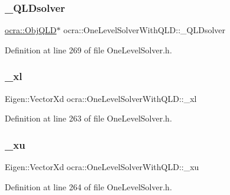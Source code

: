 \subsubsection{\texorpdfstring{\+\_\+\+Q\+L\+Dsolver}{\_QLDsolver}}
{\footnotesize\ttfamily \hyperlink{classocra_1_1ObjQLD}{ocra\+::\+Obj\+Q\+LD}$\ast$ ocra\+::\+One\+Level\+Solver\+With\+Q\+L\+D\+::\+\_\+\+Q\+L\+Dsolver\hspace{0.3cm}{\ttfamily [protected]}}



Definition at line 269 of file One\+Level\+Solver.\+h.

\hypertarget{classocra_1_1OneLevelSolverWithQLD_add5b646798e6e18dd3baa6153e42ed3a}{}\label{classocra_1_1OneLevelSolverWithQLD_add5b646798e6e18dd3baa6153e42ed3a} 
\subsubsection{\texorpdfstring{\+\_\+xl}{\_xl}}
{\footnotesize\ttfamily Eigen\+::\+Vector\+Xd ocra\+::\+One\+Level\+Solver\+With\+Q\+L\+D\+::\+\_\+xl\hspace{0.3cm}{\ttfamily [protected]}}



Definition at line 263 of file One\+Level\+Solver.\+h.

\hypertarget{classocra_1_1OneLevelSolverWithQLD_af2f22245e4805d0206f70171503501b5}{}\label{classocra_1_1OneLevelSolverWithQLD_af2f22245e4805d0206f70171503501b5} 
\subsubsection{\texorpdfstring{\+\_\+xu}{\_xu}}
{\footnotesize\ttfamily Eigen\+::\+Vector\+Xd ocra\+::\+One\+Level\+Solver\+With\+Q\+L\+D\+::\+\_\+xu\hspace{0.3cm}{\ttfamily [protected]}}



Definition at line 264 of file One\+Level\+Solver.\+h.

\hypertarget{classocra_1_1OneLevelSolverWithQLD_aabe1df1e34e0e44246736da42822c51c}{}\label{classocra_1_1OneLevelSolverWithQLD_aabe1df1e34e0e44246736da42822c51c} 
